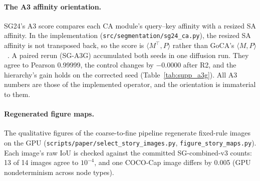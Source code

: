 \paragraph{The A3 affinity orientation.}
SG24's A3 score compares each CA module's query--key affinity with a resized SA affinity. In the implementation (\texttt{src/\allowbreak{}segmentation/\allowbreak{}sg24\_\allowbreak{}ca.py}), the resized SA affinity is not transposed back, so the score is $\langle M^\top, P\rangle$ rather than GoCA's $\langle M, P\rangle$~\cite{meng2026making}. A paired rerun (SG-A3G) accumulated both seeds in one diffusion run. They agree to Pearson 0.99999, the control changes by $-0.0000$ after R2, and the hierarchy's gain holds on the corrected seed (Table~\ref{tab:supp_a3g}). All A3 numbers are those of the implemented operator, and the orientation is immaterial to them.

\paragraph{Regenerated figure maps.}
The qualitative figures of the coarse-to-fine pipeline regenerate fixed-rule images on the GPU (\texttt{scripts/\allowbreak{}paper/\allowbreak{}select\_\allowbreak{}story\_\allowbreak{}images.py}, \texttt{figure\_\allowbreak{}story\_\allowbreak{}maps.py}). Each image's raw IoU is checked against the committed SG-combined-v3 counts: 13 of 14 images agree to $10^{-4}$, and one COCO-Cap image differs by 0.005 (GPU nondeterminism across node types).

